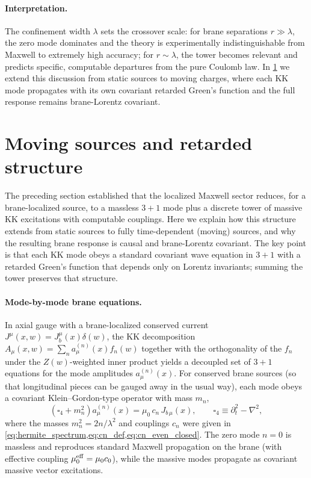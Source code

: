 \documentclass[11pt]{article}
\newcommand{\A}{A}
\newcommand{\J}{J}
\newcommand{\Z}{Z}
\newcommand{\lam}{\lambda}      %
\newcommand{\muo}{\mu_0}
\newcommand{\mueff}{\mu_0^{\rm eff}}
\begin{document}
\paragraph{Interpretation.}
The confinement width \(\lam\) sets the crossover scale: for brane separations
\(r\gg \lam\), the zero mode dominates and the theory is experimentally
indistinguishable from Maxwell to extremely high accuracy; for \(r\sim\lam\), the
tower becomes relevant and predicts specific, computable departures from the pure
Coulomb law. In \cref{sec:moving_sources} we extend this discussion from static
sources to moving charges, where each KK mode propagates with its own covariant
retarded Green's function and the full response remains brane-Lorentz covariant.

\section{Moving sources and retarded structure}
\label{sec:moving_sources}

The preceding section established that the localized Maxwell sector reduces, for a
brane-localized source, to a massless \(3+1\) mode plus a discrete tower of massive
KK excitations with computable couplings. Here we explain how this structure
extends from static sources to fully time-dependent (moving) sources, and why the
resulting brane response is causal and brane-Lorentz covariant. The key point is
that each KK mode obeys a standard covariant wave equation in \(3+1\) with a
retarded Green's function that depends only on Lorentz invariants; summing the
tower preserves that structure.

\paragraph{Mode-by-mode brane equations.}
In axial gauge with a brane-localized conserved current
\(\J^\mu(x,w)=\J_b^\mu(x)\delta(w)\), the KK decomposition
\(\A_\mu(x,w)=\sum_n a^{(n)}_\mu(x)f_n(w)\) together with the orthogonality of the
\(f_n\) under the \(\Z(w)\)-weighted inner product yields a decoupled set of
\(3+1\) equations for the mode amplitudes \(a^{(n)}_\mu(x)\). For conserved brane
sources (so that longitudinal pieces can be gauged away in the usual way), each
mode obeys a covariant Klein--Gordon-type operator with mass \(m_n\),
\begin{equation}
  \left(\square_4 + m_n^2\right)a^{(n)}_\mu(x)
  = \muo\,c_n\,\J_{b\,\mu}(x),
  \qquad
  \square_4 \equiv \partial_t^2-\nabla^2,
  \label{eq:mode_wave_eq}
\end{equation}
where the masses \(m_n^2=2n/\lam^2\) and couplings \(c_n\) were given in
\cref{eq:hermite_spectrum,eq:cn_def,eq:cn_even_closed}. The zero mode \(n=0\) is
massless and reproduces standard Maxwell propagation on the brane (with effective
coupling \(\mueff=\muo c_0\)), while the massive modes propagate as covariant
massive vector excitations.
\end{document}
